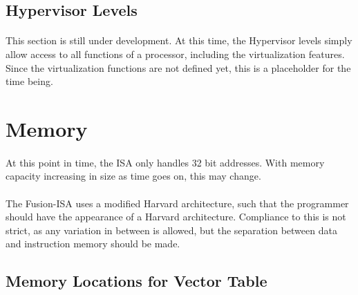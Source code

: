 \documentclass[letterpaper, 11pt]{article}
\begin{document}
\subsection{Hypervisor Levels}
\paragraph{} This section is still under development. At this time, the Hypervisor levels simply allow access to all functions of a processor, including the
virtualization features. Since the virtualization functions are not defined yet, this is a placeholder for the time being.

\clearpage
\section{Memory}
\paragraph{}At this point in time, the ISA only handles 32 bit addresses.
With memory capacity increasing in size as time goes on, this may change. %
\paragraph{} The Fusion-ISA uses a modified Harvard architecture, such that the programmer should have the appearance of a Harvard architecture.
Compliance to this is not strict, as any variation in between is allowed, but the separation between data and instruction memory should be made.

\subsection{Memory Locations for Vector Table}
\end{document}
